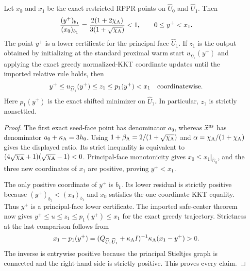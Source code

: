 \begin{lemma}
\label{lem:branch-caterpillar-second-nonsettled-safe-center}
Let $x_0$ and $x_1$ be the exact restricted RPPR points on
$\widehat U_0$ and $\widehat U_1$.  Then
\begin{equation}
 \frac{(y^+)_{b_1}}{(x_0)_{b_1}}
 =\frac{2(1+2\chi_{\rm A})}
        {3(1+\sqrt{\chi_{\rm A}})}<1,
 \qquad 0\leq y^+<x_1.
 \label{eq:branch-caterpillar-second-nonsettled-center-ratio}
\end{equation}
The point $y^+$ is a lower certificate for the principal face
$\widehat U_1$.  If $z_1$ is the output obtained by initializing at the
standard proximal warm start $u_{\widehat U_1}(y^+)$ and applying the exact
greedy normalized-KKT coordinate updates until the imported relative rule
holds, then
\begin{equation}
 y^+\leq u_{\widehat U_1}(y^+)\leq z_1
 \leq p_1(y^+)<x_1
 \quad\hbox{coordinatewise}.
 \label{eq:branch-caterpillar-second-nonsettled-safe-order}
\end{equation}
Here $p_1(y^+)$ is the exact shifted minimizer on $\widehat U_1$.
In particular, $z_1$ is strictly nonsettled.
\end{lemma}

\begin{proof}
The first exact seed-face point has denominator $a_0$, whereas
$\widehat x^{\rm ns}$ has denominator $a_0+\kappa_{\rm A}=3h_0$.
Using $1+\beta_{\rm A}=2/(1+\sqrt{\chi_{\rm A}})$ and
$\alpha=\chi_{\rm A}/(1+\chi_{\rm A})$ gives the displayed ratio.  Its
strict inequality is equivalent to
$(4\sqrt{\chi_{\rm A}}+1)(\sqrt{\chi_{\rm A}}-1)<0$.
Principal-face monotonicity gives $x_0\leq x_1|_{\widehat U_0}$, and the
three new coordinates of $x_1$ are positive, proving $y^+<x_1$.

The only positive coordinate of $y^+$ is $b_1$.  Its lower residual is
strictly positive because $(y^+)_{b_1}<(x_0)_{b_1}$ and $x_0$ satisfies the
one-coordinate KKT equality.  Thus $y^+$ is a principal-face lower
certificate.  The imported safe-center theorem now gives
$y^+\leq u\leq z_1\leq p_1(y^+)\leq x_1$ for the exact greedy trajectory.
Strictness at the last comparison follows from
\begin{equation*}
 x_1-p_1(y^+)
 =(Q_{\widehat U_1\widehat U_1}+\kappa_{\rm A}I)^{-1}
   \kappa_{\rm A}(x_1-y^+)>0.
\end{equation*}
The inverse is entrywise positive because the principal Stieltjes graph is
connected and the right-hand side is strictly positive.  This proves every
claim.
\end{proof}

